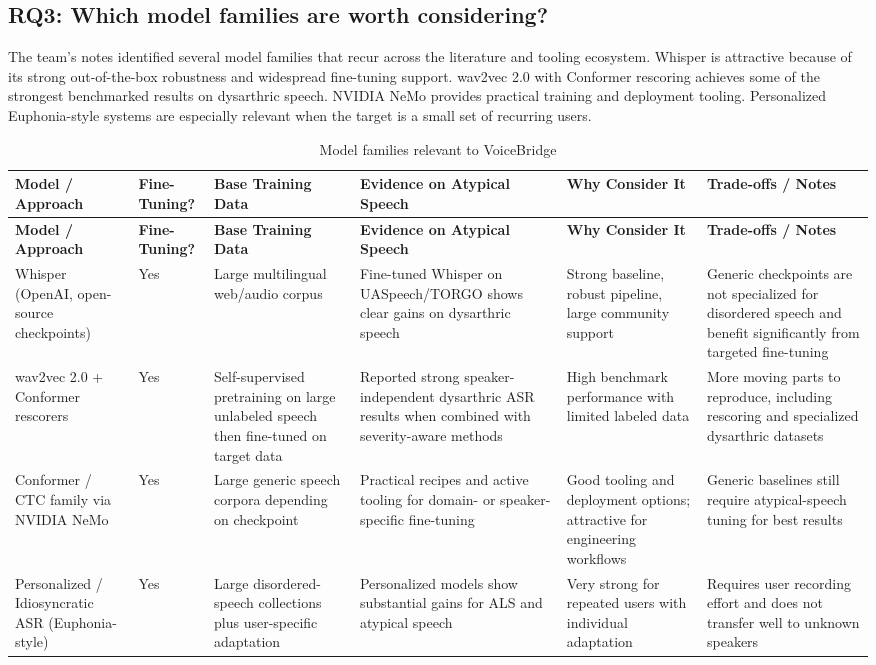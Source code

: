 \documentclass{article}
\begin{document}
\subsection*{RQ3: Which model families are worth considering?}

The team's notes identified several model families that recur across the literature and tooling ecosystem. Whisper is attractive because of its strong out-of-the-box robustness and widespread fine-tuning support. wav2vec 2.0 with Conformer rescoring achieves some of the strongest benchmarked results on dysarthric speech. NVIDIA NeMo provides practical training and deployment tooling. Personalized Euphonia-style systems are especially relevant when the target is a small set of recurring users.

\begin{longtable}{p{3.1cm} p{2.1cm} p{2.6cm} p{3.2cm} p{2.5cm} p{2.7cm}}
\caption{Model families relevant to VoiceBridge} \\
\toprule
\textbf{Model / Approach} & \textbf{Fine-Tuning?} & \textbf{Base Training Data} & \textbf{Evidence on Atypical Speech} & \textbf{Why Consider It} & \textbf{Trade-offs / Notes} \\
\midrule
\endfirsthead
\toprule
\textbf{Model / Approach} & \textbf{Fine-Tuning?} & \textbf{Base Training Data} & \textbf{Evidence on Atypical Speech} & \textbf{Why Consider It} & \textbf{Trade-offs / Notes} \\
\midrule
\endhead
Whisper (OpenAI, open-source checkpoints) & Yes & Large multilingual web/audio corpus & Fine-tuned Whisper on UASpeech/TORGO shows clear gains on dysarthric speech & Strong baseline, robust pipeline, large community support & Generic checkpoints are not specialized for disordered speech and benefit significantly from targeted fine-tuning \\
wav2vec 2.0 + Conformer rescorers & Yes & Self-supervised pretraining on large unlabeled speech then fine-tuned on target data & Reported strong speaker-independent dysarthric ASR results when combined with severity-aware methods & High benchmark performance with limited labeled data & More moving parts to reproduce, including rescoring and specialized dysarthric datasets \\
Conformer / CTC family via NVIDIA NeMo & Yes & Large generic speech corpora depending on checkpoint & Practical recipes and active tooling for domain- or speaker-specific fine-tuning & Good tooling and deployment options; attractive for engineering workflows & Generic baselines still require atypical-speech tuning for best results \\
Personalized / Idiosyncratic ASR (Euphonia-style) & Yes & Large disordered-speech collections plus user-specific adaptation & Personalized models show substantial gains for ALS and atypical speech & Very strong for repeated users with individual adaptation & Requires user recording effort and does not transfer well to unknown speakers \\
\bottomrule
\end{longtable}
\end{document}
